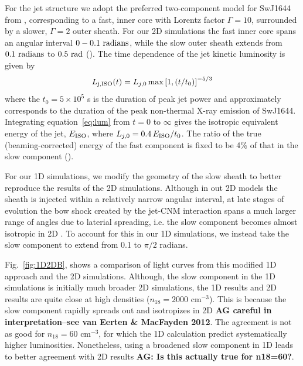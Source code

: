 \documentclass[usenatbib,fleqn]{mnras}
\begin{document}
For the jet structure we adopt the preferred two-component model for
SwJ1644 from \citet{Mimica+2015}, corresponding to a fast, inner core
with Lorentz factor $\Gamma = 10$, surrounded by a slower, $\Gamma=2$
outer sheath.  For our 2D simulations the fast inner core spans an
angular interval $0-0.1\ {\rm radians}$, while the slow outer sheath
extends from $0.1\ {\rm radians}$ to $0.5\ {\rm rad}$
(\citealt{Mimica+2015}).  The time dependence of the jet kinetic
luminosity is given by
\begin{equation}\label{eq:lum}
L_{\rm j, ISO}(t) = L_{j,0}\max\left[1, (t/t_0)\right]^{-5/3}
\end{equation}
%
where the $t_0 = 5\times 10^5$ s is the duration of peak jet power and
approximately corresponds to the duration of the peak non-thermal
X-ray emission of SwJ1644.  Integrating equation~\ref{eq:lum} from $t
= 0$ to $\infty$ gives the isotropic equivalent energy of the jet,
$E_{\rm ISO}$, where $L_{j,0}=0.4\, E_{\rm ISO}/t_0$.  The ratio of
the true (beaming-corrected) energy of the fast component is fixed to
be 4\% of that in the slow component (\citealt{Mimica+2015}).

For our 1D simulations, we modify the geometry of the slow sheath to
better reproduce the results of the 2D simulations.  Although in out
2D models the sheath is injected within a relatively narrow angular
interval, at late stages of evolution the bow shock created by the
jet-CNM interaction spans a much larger range of angles due to
laterial spreading, i.e. the slow component becomes almost isotropic
in 2D \citep[bottom two panels of Fig.~8 in][]{Mimica+2015}. To
account for this in our 1D simulations, we instead take the slow
component to extend from 0.1 to $\pi/2$ radians.

Fig.~\ref{fig:1D2DB}, shows a comparison of light curves from this
modified 1D approach and the 2D simulations. Although, the slow
component in the 1D simulations is initially much broader 2D
simulations, the 1D results and 2D results are quite close at high
densities ($n_{18}=2000$ cm$^{-3}$). This is because the slow
component rapidly spreads out and isotropizes in 2D {\bf AG careful in
  interpretation--see van Eerten \& MacFayden 2012}. The agreement is
not as good for $n_{18}=60$ cm$^{-3}$, for which the 1D calculation
predict systematically higher luminosities. Nonetheless, using a
broadened slow component in 1D leads to better agreement with 2D
results {\bf AG: Is this actually true for n18=60?}.

\end{document}
